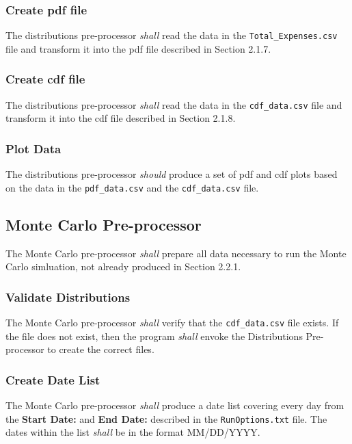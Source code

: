 {\subsubsection{Create pdf file}
The distributions pre-processor {\textit{shall}} read the data in the 
{\texttt{Total\_Expenses.csv}} file and transform it into the pdf file
described in Section 2.1.7.

\subsubsection{Create cdf file}
The distributions pre-processor {\textit{shall}} read the data in the 
{\texttt{cdf\_data.csv}} file and transform it into the cdf file
described in Section 2.1.8.

\subsubsection{Plot Data}
The distributions pre-processor {\textit{should}} produce a set of
pdf and cdf plots based on the data in the {\texttt{pdf\_data.csv}}
and the {\texttt{cdf\_data.csv}} file.

\subsection{Monte Carlo Pre-processor}
The Monte Carlo pre-processor {\textit{shall}} prepare all data necessary to run the 
Monte Carlo simluation, not already produced in Section 2.2.1.

\subsubsection{Validate Distributions}
The Monte Carlo pre-processor {\textit{shall}} verify that the {\texttt{cdf\_data.csv}}
file exists.  If the file does not exist, then the program {\textit{shall}} envoke
the Distributions Pre-processor to create the correct files.

\subsubsection{Create Date List}
The Monte Carlo pre-processor {\textit{shall}} produce a date list covering
every day from the {\textbf{Start Date:}} and {\textbf{End Date:}} described
in the {\texttt{RunOptions.txt}} file.  The dates within the list {\textit{shall}}
be in the format MM/DD/YYYY.

}

